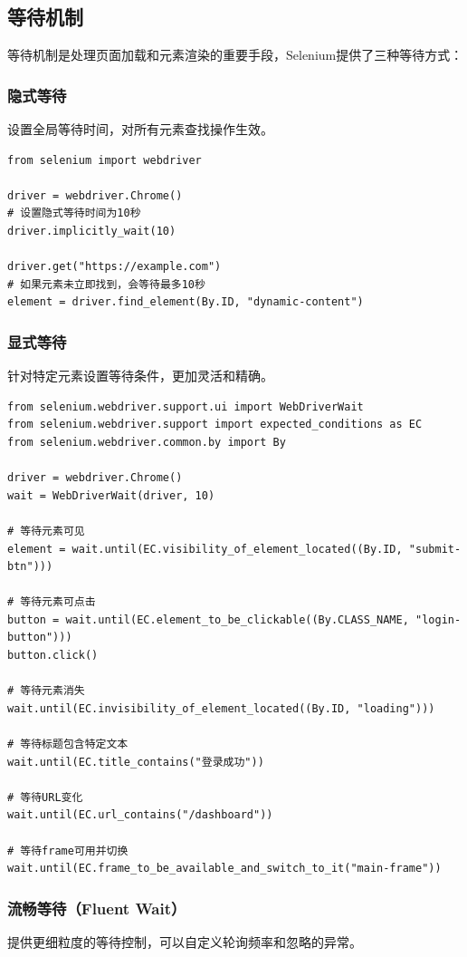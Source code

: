 \subsection{等待机制}

等待机制是处理页面加载和元素渲染的重要手段，Selenium提供了三种等待方式：

\subsubsection{隐式等待}
设置全局等待时间，对所有元素查找操作生效。

\begin{lstlisting}[style=demostyle,numbers=none]
from selenium import webdriver

driver = webdriver.Chrome()
# 设置隐式等待时间为10秒
driver.implicitly_wait(10)

driver.get("https://example.com")
# 如果元素未立即找到，会等待最多10秒
element = driver.find_element(By.ID, "dynamic-content")
\end{lstlisting}

\subsubsection{显式等待}
针对特定元素设置等待条件，更加灵活和精确。

\begin{lstlisting}[style=demostyle,numbers=none]
from selenium.webdriver.support.ui import WebDriverWait
from selenium.webdriver.support import expected_conditions as EC
from selenium.webdriver.common.by import By

driver = webdriver.Chrome()
wait = WebDriverWait(driver, 10)

# 等待元素可见
element = wait.until(EC.visibility_of_element_located((By.ID, "submit-btn")))

# 等待元素可点击
button = wait.until(EC.element_to_be_clickable((By.CLASS_NAME, "login-button")))
button.click()

# 等待元素消失
wait.until(EC.invisibility_of_element_located((By.ID, "loading")))

# 等待标题包含特定文本
wait.until(EC.title_contains("登录成功"))

# 等待URL变化
wait.until(EC.url_contains("/dashboard"))

# 等待frame可用并切换
wait.until(EC.frame_to_be_available_and_switch_to_it("main-frame"))
\end{lstlisting}

\subsubsection{流畅等待（Fluent Wait）}
提供更细粒度的等待控制，可以自定义轮询频率和忽略的异常。

